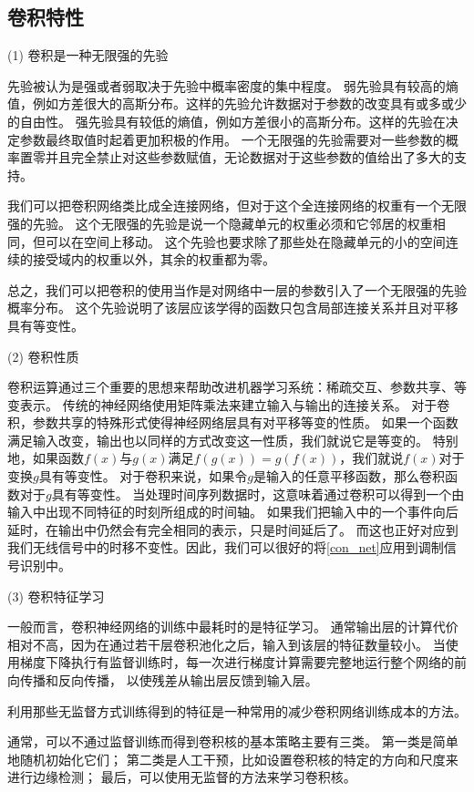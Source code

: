 \subsection{卷积特性}
(1) 卷积是一种无限强的先验\par
先验被认为是强或者弱取决于先验中概率密度的集中程度。
弱先验具有较高的熵值，例如方差很大的高斯分布。这样的先验允许数据对于参数的改变具有或多或少的自由性。
强先验具有较低的熵值，例如方差很小的高斯分布。这样的先验在决定参数最终取值时起着更加积极的作用。
一个无限强的先验需要对一些参数的概率置零并且完全禁止对这些参数赋值，无论数据对于这些参数的值给出了多大的支持。\par
我们可以把卷积网络类比成全连接网络，但对于这个全连接网络的权重有一个无限强的先验。
这个无限强的先验是说一个隐藏单元的权重必须和它邻居的权重相同，但可以在空间上移动。
这个先验也要求除了那些处在隐藏单元的小的空间连续的接受域内的权重以外，其余的权重都为零。\par
总之，我们可以把卷积的使用当作是对网络中一层的参数引入了一个无限强的先验概率分布。
这个先验说明了该层应该学得的函数只包含局部连接关系并且对平移具有等变性。\par

(2) 卷积性质\par
卷积运算通过三个重要的思想来帮助改进机器学习系统：稀疏交互、参数共享、等变表示。
传统的神经网络使用矩阵乘法来建立输入与输出的连接关系。
对于卷积，参数共享的特殊形式使得神经网络层具有对平移等变的性质。
如果一个函数满足输入改变，输出也以同样的方式改变这一性质，我们就说它是等变的。
特别地，如果函数$f(x)$与$g(x)$满足$f(g(x))= g(f(x))$，我们就说$f(x)$对于变换$g$具有等变性。
对于卷积来说，如果令$g$是输入的任意平移函数，那么卷积函数对于$g$具有等变性。
当处理时间序列数据时，这意味着通过卷积可以得到一个由输入中出现不同特征的时刻所组成的时间轴。
如果我们把输入中的一个事件向后延时，在输出中仍然会有完全相同的表示，只是时间延后了。
而这也正好对应到我们无线信号中的时移不变性。因此，我们可以很好的将\ref{con_net}应用到调制信号识别中。\par

(3) 卷积特征学习\par
一般而言，卷积神经网络的训练中最耗时的是特征学习。
通常输出层的计算代价相对不高，因为在通过若干层卷积池化之后，输入到该层的特征数量较小。
当使用梯度下降执行有监督训练时，每一次进行梯度计算需要完整地运行整个网络的前向传播和反向传播，
以使残差从输出层反馈到输入层。

利用那些无监督方式训练得到的特征是一种常用的减少卷积网络训练成本的方法。\par

通常，可以不通过监督训练而得到卷积核的基本策略主要有三类。
第一类是简单地随机初始化它们；
第二类是人工干预，比如设置卷积核的特定的方向和尺度来进行边缘检测；
最后，可以使用无监督的方法来学习卷积核。\par

